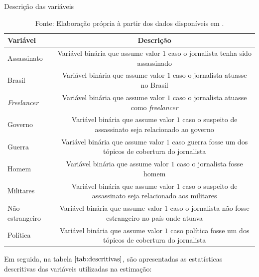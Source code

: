 \documentclass[12pt,
               openright,
               oneside,
               a4paper,
							 section=TITLE,     %
               subsection=Title,  %
               english,brazil]{article}
\begin{document}
\begin{table}[H]
\centering
{}
\caption{Descrição das  variáveis}
\label{tab:dados}
\begin{tabularx}{\textwidth}{lc} \\
Variável &  Descrição \\ \midrule
Assassinato  & Variável binária que assume valor $1$ caso o jornalista tenha sido assassinado \\ 
Brasil & Variável binária que assume valor $1$ caso o jornalista atuasse no Brasil \\  
\textit{Freelancer} & Variável binária que assume valor $1$ caso o jornalista atuasse como \textit{freelancer}\\ Governo & Variável binária que assume valor $1$ caso o suspeito de assassinato seja relacionado ao governo \\ Guerra & Variável binária que assume valor $1$ caso guerra fosse um dos tópicos de cobertura do jornalista \\ Homem & Variável binária que assume valor $1$ caso o jornalista fosse homem \\ Militares & Variável binária que assume valor $1$ caso o suspeito de assassinato seja relacionado aos militares \\ Não-estrangeiro & Variável binária que assume valor $1$ caso o jornalista não fosse estrangeiro no país onde atuava \\ Política & Variável binária que assume valor $1$ caso política fosse um dos tópicos de cobertura do jornalista  \\ \bottomrule 
\end{tabularx}
\caption*{Fonte: Elaboração própria à partir dos dados disponíveis em \cite{CPJ2020}.}
\end{table}

Em seguida, na tabela $\ref{tab:descritivas}$, são apresentadas as estatísticas descritivas das variáveis utilizadas na estimação:
\end{document}
